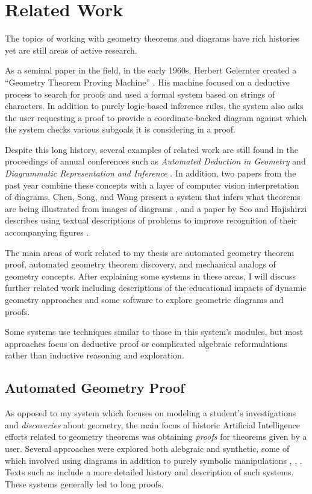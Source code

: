 \chapter{Related Work}
\label{chap:related-work}

The topics of working with geometry theorems and diagrams have rich
histories yet are still areas of active research.

As a seminal paper in the field, in the early 1960s, Herbert Gelernter
created a ``Geometry Theorem Proving Machine'' \cite{gelernter}. His
machine focused on a deductive process to search for proofs and used a
formal system based on strings of characters. In addition to purely
logic-based inference rules, the system also asks the user requesting
a proof to provide a coordinate-backed diagram against which the
system checks various subgoals it is considering in a proof.

Despite this long history, several examples of related work are still
found in the proceedings of annual conferences such as \emph{Automated
  Deduction in Geometry} \cite{autoDeduction} and \emph {Diagrammatic
  Representation and Inference} \cite{diagramInference}.  In addition,
two papers from the past year combine these concepts with a layer of
computer vision interpretation of diagrams.  Chen, Song, and Wang
present a system that infers what theorems are being illustrated from
images of diagrams \cite{fromImages}, and a paper by Seo and
Hajishirzi describes using textual descriptions of problems to improve
recognition of their accompanying figures \cite{diagramUnderstanding}.

The main areas of work related to my thesis are automated geometry
theorem proof, automated geometry theorem discovery, and mechanical
analogs of geometry concepts. After explaining some systems in these
areas, I will discuss further related work including descriptions of
the educational impacts of dynamic geometry approaches and some
software to explore geometric diagrams and proofs.

Some systems use techniques similar to those in this system's modules,
but most approaches focus on deductive proof or complicated algebraic
reformulations rather than inductive reasoning and exploration.

\section{Automated Geometry Proof}

As opposed to my system which focuses on modeling a student's
investigations and \emph{discoveries} about geometry, the main focus
of historic Artificial Intelligence efforts related to geometry
theorems was obtaining \emph{proofs} for theorems given by a
user. Several approaches were explored both alebgraic and synthetic,
some of which involved using diagrams in addition to purely symbolic
manipulations \cite{chou1988mechanical},
\cite{goldstein1973elementary}, \cite{nevins1975plane}. Texts such as
\cite{jamnik2001mathematical} include a more detailed history and
description of such systems. These systems generally led to long
proofs.

